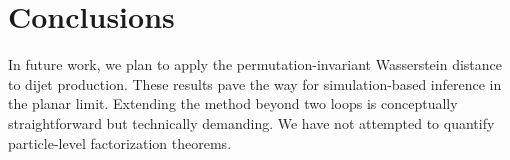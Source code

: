 \section{Conclusions}\label{sec:conclusions}

In future work, we plan to apply the permutation-invariant Wasserstein
distance to dijet production. These results pave the way for
simulation-based inference in the planar limit. Extending the method
beyond two loops is conceptually straightforward but technically
demanding. We have not attempted to quantify particle-level
factorization theorems.

